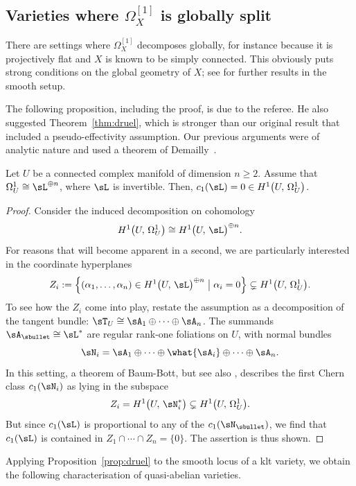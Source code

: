 \subsection{Varieties where $\Omega^{[1]}_X$ is globally split}
\label{sec:4-2}

There are settings where $\Omega^{[1]}_X$ decomposes globally, for instance because
it is projectively flat and $X$ is known to be simply connected. This obviously
puts strong conditions on the global geometry of $X$; see \cite{MR1758581} for
further results in the smooth setup.

The following proposition, including the proof, is due to the referee. He also
suggested Theorem~\ref{thm:druel}, which is stronger than our original result
that included a pseudo-effectivity assumption. Our previous arguments were of
analytic nature and used a theorem of Demailly~\cite{Dem02}.

\begin{prop}\label{prop:druel}
Let $U$ be a connected complex manifold of dimension $n \geq 2$. Assume that
$\Omega^1_U \cong \sL^{\oplus n}$, where $\sL$ is invertible. Then,
$c_1(\sL) = 0 \in H^1 \bigl(U,\, \Omega^1_U \bigr)$.
\end{prop}
\begin{proof}
Consider the induced decomposition on cohomology
\[
H^1 \bigl(U,\, \Omega^1_U\bigr) \cong H^1\bigl(U,\, \sL \bigr)^{\oplus n}.
\]
For reasons that
will become apparent in a second, we are particularly interested in the
coordinate hyperplanes
\[
Z_i := \left\{ (\alpha_1, \dots, \alpha_n) \in H^1\bigl(U,\, \sL \bigr)^{\oplus n} \bigm| \alpha_i = 0
\right\} \subsetneq H^1 \bigl(U,\, \Omega^1_U \bigr).
\]
To see how the $Z_i$ come into play, restate the assumption as a decomposition
of the tangent bundle: $\sT_U \cong \sA_1 \oplus \cdots \oplus \sA_n$. The summands $\sA_\sbullet \cong \sL^*$ are
regular rank-one foliations on $U$, with normal bundles
\[
\sN_i = \sA_1 \oplus \cdots \oplus \what{\sA_i} \oplus \cdots \oplus \sA_n.
\]
In this setting, a theorem of Baum-Bott, \cite[Prop.\,3.3 \&
Cor.~3.4]{MR0261635} but see also \cite[Lem.\,3.1]{MR1760872}, describes the
first Chern class $c_1(\sN_i)$ as lying in the subspace
\[
Z_i = H^1 \bigl(U,\, \sN_i^* \bigr) \subsetneq H^1 \bigl(U,\, \Omega^1_U \bigr).
\]
But since $c_1(\sL)$ is proportional to any of the $c_1(\sN_\sbullet)$, we find that
$c_1(\sL)$ is contained in $Z_1 \cap\cdots\cap Z_n = \{0\}$. The assertion is thus shown.
\end{proof}

Applying Proposition~\ref{prop:druel} to the smooth locus of a klt variety, we
obtain the following characterisation of quasi-abelian varieties.


